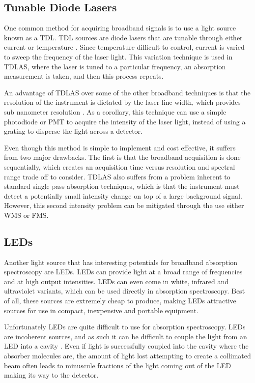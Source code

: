 \subsection{Tunable Diode Lasers}\label{subsec:tdl}

One common method for acquiring broadband signals is to use a light source
known as a \acf{TDL}. \ac{TDL} sources are diode lasers that are tunable
through either current or temperature \cite{May:1998ue}. Since temperature
difficult to control, current is varied to sweep the frequency of the laser
light. This variation technique is used in \ac{TDLAS}, where the laser is tuned
to a particular frequency, an absorption measurement is taken, and then this
process repeats.

An advantage of \ac{TDLAS} over some of the other broadband techniques is that
the resolution of the instrument is dictated by the laser line width, which
provides sub nanometer resolution \cite{Berden:2009wk}. As a corollary, this
technique can use a simple photodiode or \ac{PMT} to acquire the intensity of
the laser light, instead of using a grating to disperse the light across a
detector.

Even though this method is simple to implement and cost effective, it suffers
from two major drawbacks. The first is that the broadband acquisition is done
sequentially, which creates an acquisition time versus resolution and spectral
range trade off to consider. \ac{TDLAS} also suffers from a problem inherent
to standard single pass absorption techniques, which is that the instrument
must detect a potentially small intensity change on top of a large background
signal. However, this second intensity problem can be mitigated through the use
either \ac{WMS} \cite{Reid:1981vq} or \ac{FMS}.

\subsection{LEDs}\label{subsec:led}

Another light source that has interesting potentials for broadband absorption
spectroscopy are \acp{LED}. \acp{LED} can provide light at a broad range of
frequencies and at high output intensities. \acp{LED} can even come in white,
infrared and ultraviolet variants, which can be used directly in absorption
spectroscopy. Best of all, these sources are extremely cheap to produce, making
\acp{LED} attractive sources for use in compact, inexpensive and portable
equipment.

Unfortunately \acp{LED} are quite difficult to use for absorption
spectroscopy.  \acp{LED} are incoherent sources, and as such it can be
difficult to couple the light from an \ac{LED} into a
cavity \cite{Seetohul:2009du,Islam:2007ea}. Even if light is successfully
coupled into the cavity where the absorber molecules are, the amount of light
lost attempting to create a collimated beam often leads to minuscule fractions
of the light coming out of the \ac{LED} making its way to the detector.

